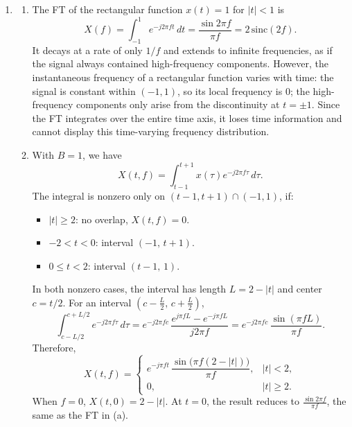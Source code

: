 \documentclass[12pt,a4paper]{article}
\begin{document}
\begin{enumerate}
\begin{enumerate}[label=(\alph*)]
  \item \textbf{No.} An image is a 2D spatial signal without the time axis, so there is no frequency variation with time to analyze. Image identification usually uses the 2D FT, feature extraction, or CNN instead.

  \item \textbf{Yes.} The pitch of animal voices (e.g. bird songs, whale calls) varies with time. The FT only shows which frequencies appear in the whole signal, while the STFT shows how the instantaneous frequency changes with time.
\end{enumerate}

\item
  \begin{enumerate}[label=(\alph*)]
    \item The FT of the rectangular function $x(t)=1$ for $|t|<1$ is
    \[
    X(f)=\int_{-1}^{1}e^{-j2\pi ft}\,dt=\frac{\sin 2\pi f}{\pi f}=2\,\mathrm{sinc}(2f).
    \]
    It decays at a rate of only $1/f$ and extends to infinite frequencies, as if the signal always contained high-frequency components. However, the instantaneous frequency of a rectangular function varies with time: the signal is constant within $(-1,1)$, so its local frequency is $0$; the high-frequency components only arise from the discontinuity at $t=\pm1$. Since the FT integrates over the entire time axis, it loses time information and cannot display this time-varying frequency distribution.

    \item With $B=1$, we have
    \[
    X(t,f)=\int_{t-1}^{t+1}x(\tau)e^{-j2\pi f\tau}\,d\tau .
    \]
    The integral is nonzero only on $(t-1,t+1)\cap(-1,1)$, if:

    \begin{itemize}
      \item $|t|\ge 2$: no overlap, $X(t,f)=0$.
      \item $-2<t<0$: interval $(-1,\,t+1)$.
      \item $0\le t<2$: interval $(t-1,\,1)$.
    \end{itemize}
    In both nonzero cases, the interval has length $L=2-|t|$ and center $c=t/2$. For an interval $(c-\frac{L}{2},\,c+\frac{L}{2})$,
    \[
    \int_{c-L/2}^{c+L/2}e^{-j2\pi f\tau}\,d\tau
    =e^{-j2\pi fc}\,\frac{e^{j\pi fL}-e^{-j\pi fL}}{j2\pi f}
    =e^{-j2\pi fc}\,\frac{\sin(\pi fL)}{\pi f}.
    \]
    Therefore,
    \[
    X(t,f)=
    \begin{cases}
      e^{-j\pi ft}\,\dfrac{\sin\!\big(\pi f(2-|t|)\big)}{\pi f}, & |t|<2,\\[3mm]
      0, & |t|\ge 2.
    \end{cases}
    \]
    When $f=0$, $X(t,0)=2-|t|$. At $t=0$, the result reduces to $\frac{\sin 2\pi f}{\pi f}$, the same as the FT in (a).
  \end{enumerate}




\end{enumerate}
\end{document}
